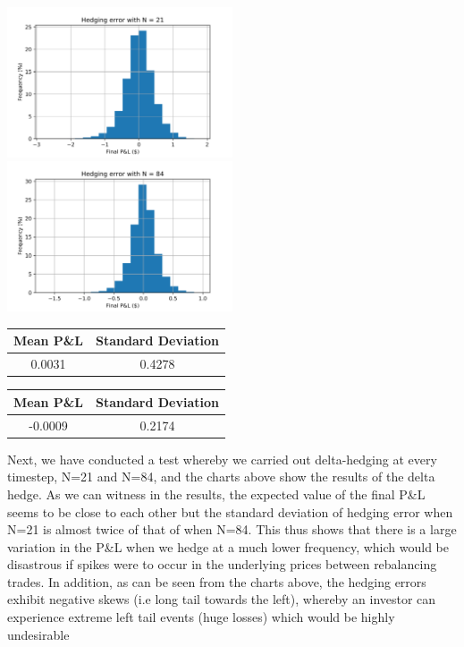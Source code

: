\documentclass{article}
\begin{document}
\begin{center}
	\includegraphics[width=0.5\textwidth]{./images/error_21.jpg}%
	\includegraphics[width=0.5\textwidth]{./images/error_84.jpg}
\end{center}

\begin{center}
	\begin{tabular}{|c|c|}
		\hline
		\textbf{Mean P\&L}& \textbf{Standard Deviation}\\
		\hline
		0.0031 & 0.4278
		\\
		\hline
	\end{tabular}
	\qquad\qquad\qquad
	\begin{tabular}{|c|c|}
		\hline
		\textbf{Mean P\&L}& \textbf{Standard Deviation}\\
		\hline
		-0.0009 & 0.2174
		\\
		\hline
	\end{tabular}
\end{center} 

\bigskip
\noindent Next, we have conducted a test whereby we carried out delta-hedging at every timestep, N=21 and N=84, and the charts above show the results of the delta hedge. As we can witness in the results, the expected value of the final P\&L seems to be close to each other but the standard deviation of hedging error when N=21 is almost twice of that of when N=84. This thus shows that there is a large variation in the P\&L when we hedge at a much lower frequency, which would be disastrous if spikes were to occur in the underlying prices between rebalancing trades. In addition, as can be seen from the charts above, the hedging errors exhibit negative skews (i.e long tail towards the left), whereby an investor can experience extreme left tail events (huge losses) which would be highly undesirable \\ \\
\end{document}
